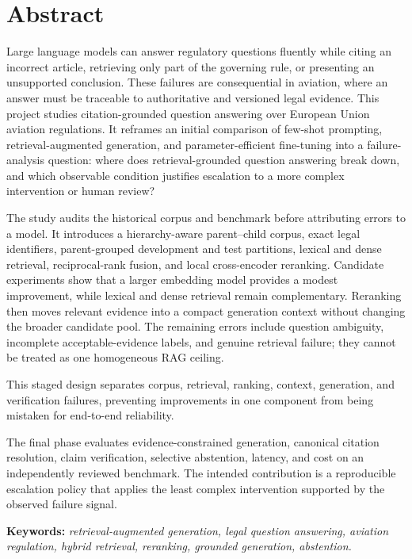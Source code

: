 \chapter*{Abstract}

Large language models can answer regulatory questions fluently while citing an incorrect article, retrieving only part of the governing rule, or presenting an unsupported conclusion. These failures are consequential in aviation, where an answer must be traceable to authoritative and versioned legal evidence. This project studies citation-grounded question answering over European Union aviation regulations. It reframes an initial comparison of few-shot prompting, retrieval-augmented generation, and parameter-efficient fine-tuning into a failure-analysis question: where does retrieval-grounded question answering break down, and which observable condition justifies escalation to a more complex intervention or human review?

The study audits the historical corpus and benchmark before attributing errors to a model. It introduces a hierarchy-aware parent--child corpus, exact legal identifiers, parent-grouped development and test partitions, lexical and dense retrieval, reciprocal-rank fusion, and local cross-encoder reranking. Candidate experiments show that a larger embedding model provides a modest improvement, while lexical and dense retrieval remain complementary. Reranking then moves relevant evidence into a compact generation context without changing the broader candidate pool. The remaining errors include question ambiguity, incomplete acceptable-evidence labels, and genuine retrieval failure; they cannot be treated as one homogeneous RAG ceiling.

This staged design separates corpus, retrieval, ranking, context, generation, and verification failures, preventing improvements in one component from being mistaken for end-to-end reliability.

The final phase evaluates evidence-constrained generation, canonical citation resolution, claim verification, selective abstention, latency, and cost on an independently reviewed benchmark. The intended contribution is a reproducible escalation policy that applies the least complex intervention supported by the observed failure signal.

\medskip
\noindent\textbf{\color{aivancityNavy}Keywords:}
\textit{\color{aivancityGray}retrieval-augmented generation, legal question answering, aviation regulation, hybrid retrieval, reranking, grounded generation, abstention.}

